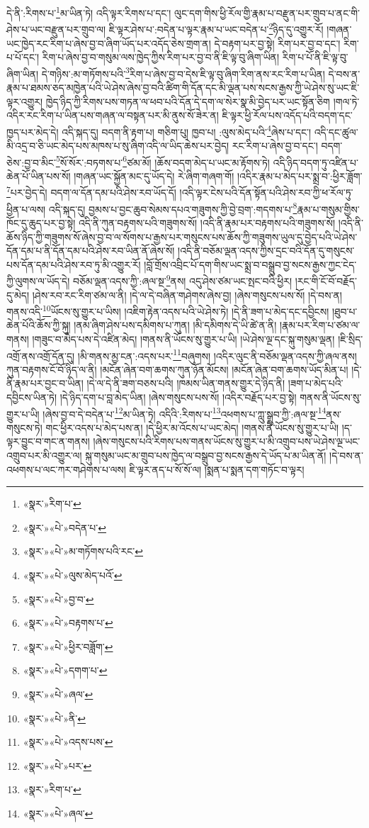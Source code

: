 དེ་ནི་:རིགས་པ་\footnote{«སྣར་»རིག་པ་}མ་ཡིན་ཏེ། འདི་ལྟར་རིགས་པ་དང་། ལུང་དག་གིས་ཕྱི་རོལ་གྱི་རྣམ་པ་བརྫུན་པར་གྲུབ་པ་ནང་གི་ཤེས་པ་ཡང་བརྫུན་པར་གྲུབ་ལ། ཇི་ལྟར་ཤེས་པ་:བདེན་པ་ལྟར་རྣམ་པ་ཡང་བདེན་པ་\footnote{«སྣར་»«པེ་»བདེན་པ་}ཉིད་དུ་འགྱུར་རོ། །གཞན་ཡང་ཁྱེད་རང་རིག་པ་ཞེས་བྱ་བ་ཞིག་ཡོད་པར་འདོད་ཅེས་གྲག་ན། དེ་བརྟག་པར་བྱ་སྟེ། རིག་པར་བྱ་བ་དང་། རིག་པ་པོ་དང་། རིག་པ་ཞེས་བྱ་བ་གསུམ་ལས་ཁྱེད་ཀྱིས་རིག་པར་བྱ་བ་ནི་ཇི་ལྟ་བུ་ཞིག་ཡིན། རིག་པ་པོ་ནི་ཇི་ལྟ་བུ་ཞིག་ཡིན། དེ་གཉིས་:མ་གཏོགས་པའི་\footnote{«སྣར་»«པེ་»མ་གཏོགས་པའི་རང་}རིག་པ་ཞེས་བྱ་བ་དེས་ཇི་ལྟ་བུ་ཞིག་རིག་ནས་རང་རིག་པ་ཡིན། དེ་བས་ན་རྣམ་པ་ཐམས་ཅད་མཁྱེན་པའི་ཡེ་ཤེས་ཞེས་བྱ་བའི་ཚིག་གི་དོན་དང་མི་ལྡན་པས་སངས་རྒྱས་ཀྱི་ཡེ་ཤེས་སུ་ཡང་ཇི་ལྟར་འགྱུར། ཁྱེད་ཉིད་ཀྱི་རིགས་པས་གཏན་ལ་ཕབ་པའི་དོན་དེ་དག་ལ་སེར་སྣ་མི་བྱེད་པར་ཡང་སྟོན་ཅིག །གལ་ཏེ་འདིར་རང་རིག་པ་ཡིན་པས་གཞན་ལ་བསྟན་པར་མི་ནུས་སོ་ཟེར་ན། ཇི་ལྟར་ཕྱི་རོལ་པས་འདོད་པའི་བདག་དང་ཁྱད་པར་མེད་དེ། འདི་སྐད་དུ། བདག་ནི་རྟག་པ། གཅིག་པུ། ཁྱབ་པ། :ལུས་མེད་པའི་\footnote{«སྣར་»«པེ་»ལུས་མེད་པའོ་}ཞེས་པ་དང་། འདི་དང་ཚུལ་མི་འདྲ་བ་ཅི་ཡང་མེད་པས་མཁས་པ་སུ་ཞིག་འདི་ལ་ཡིད་ཆེས་པར་བྱེད། རང་རིག་པ་ཞེས་བྱ་བ་དང་། བདག་ཅེས་:བྱ་བ་མིང་\footnote{«སྣར་»«པེ་»བྱ་བ་}སོ་སོར་:བཏགས་པ་\footnote{«སྣར་»«པེ་»བརྟགས་པ་}ཙམ་མོ། །ཆོས་བདག་མེད་པ་ཡང་མ་རྟོགས་ཏེ། འདི་ཉིད་བདག་ཏུ་འཛིན་པ་ཆེན་པོ་ཡིན་པས་སོ། །གཞན་ཡང་སྐྱོན་མང་དུ་ཡོད་དེ། རེ་ཞིག་གཞག་གོ། །འདིར་རྣམ་པ་མེད་པར་སྨྲ་བ་:ཕྱིར་ཟློག་\footnote{«སྣར་»«པེ་»ཕྱིར་བཟློག་}པར་བྱེད་དེ། བདག་ལ་དོན་དམ་པའི་ཤེས་རབ་ཡོད་དོ། །འདི་ལྟར་ངེས་པའི་དོན་སྟོན་པའི་ཤེས་རབ་ཀྱི་ཕ་རོལ་ཏུ་ཕྱིན་པ་ལས། འདི་སྐད་དུ། བྱམས་པ་བྱང་ཆུབ་སེམས་དཔའ་གཟུགས་ཀྱི་བྱེ་བྲག་:གདགས་པ་\footnote{«སྣར་»«པེ་»དགག་པ་}རྣམ་པ་གསུམ་གྱིས་ཁོང་དུ་ཆུད་པར་བྱ་སྟེ། འདི་ནི་ཀུན་བརྟགས་པའི་གཟུགས་སོ། །འདི་ནི་རྣམ་པར་བརྟགས་པའི་གཟུགས་སོ། །འདི་ནི་ཆོས་ཉིད་ཀྱི་གཟུགས་སོ་ཞེས་བྱ་བ་ལ་སོགས་པ་རྒྱས་པར་གསུངས་པས་ཆོས་ཀྱི་གཟུགས་ཡུལ་དུ་བྱེད་པའི་ཡེ་ཤེས་དོན་དམ་པ་ནི་དོན་དམ་པའི་ཤེས་རབ་ཡིན་ནོ་ཞེས་སོ། །འདི་ནི་བཅོམ་ལྡན་འདས་ཀྱིས་དྲང་བའི་དོན་དུ་གསུངས་པས་དོན་དམ་པའི་ཤེས་རབ་ཏུ་མི་འགྱུར་རོ། །བློ་གྲོས་འབྲིང་པོ་དག་གིས་ཡང་སྨྲ་བ་བསྒྲུབ་བྱ་སངས་རྒྱས་ཀྱང་ངེད་ཀྱི་ལུགས་ལ་ཡོད་དེ། བཅོམ་ལྡན་འདས་ཀྱི་:ཞལ་སྔ་\footnote{«སྣར་»«པེ་»ཞལ་}ནས། འདུ་ཤེས་ཙམ་ཡང་སྤང་བའི་ཕྱིར། །རང་གི་ངོ་བོ་བརྗོད་དུ་མེད། །ཤེས་རབ་རང་རིག་ཙམ་ལ་ནི། །དེ་ལ་དེ་བཞིན་གཤེགས་ཞེས་བྱ། །ཞེས་གསུངས་པས་སོ། །དེ་བས་ན། གནས་འདི་\footnote{«སྣར་»«པེ་»ནི་}ཡོངས་སུ་གྱུར་པ་ཡིས། །འཇིག་རྟེན་འདས་པའི་ཡེ་ཤེས་ཏེ། །དེ་ནི་ཟག་པ་མེད་དང་དབྱིངས། །ཐུབ་པ་ཆེན་པོའི་ཆོས་ཀྱི་སྐུ། །ནམ་ཞིག་ཤེས་པས་དམིགས་པ་ཀུན། །མི་དམིགས་དེ་ཡི་ཚེ་ན་ནི། །རྣམ་པར་རིག་པ་ཙམ་ལ་གནས། །གཟུང་བ་མེད་པས་དེ་འཛིན་མེད། །གནས་ནི་ཡོངས་སུ་གྱུར་པ་ཡི། །ཡེ་ཤེས་ལྔ་དང་སྐུ་གསུམ་ལྡན། །ཇི་སྲིད་འགྲོ་ནས་འགྲོ་དོན་དུ། །མི་གནས་མྱ་ངན་:འདས་པར་\footnote{«སྣར་»«པེ་»འདས་པས་}བཞུགས། །འདིར་ལུང་ནི་བཅོམ་ལྡན་འདས་ཀྱི་ཞལ་ནས། ཀུན་བརྟགས་ངོ་བོ་ཉིད་ལ་ནི། །མངོན་ཞེན་བག་ཆགས་ཀུན་ཉོན་མོངས། །མངོན་ཞེན་བག་ཆགས་ཡོད་མིན་པ། །དེ་ནི་རྣམ་པར་བྱང་བ་ཡིན། །དེ་ལ་དེ་ནི་ཟག་བཅས་པའི། །ཁམས་ཡིན་གནས་གྱུར་དེ་ཉིད་ནི། །ཟག་པ་མེད་པའི་དབྱིངས་ཡིན་ཏེ། །དེ་ཉིད་དག་པ་བླ་མེད་ཡིན། །ཞེས་གསུངས་པས་སོ། །འདིར་བརྗོད་པར་བྱ་སྟེ། གནས་ནི་ཡོངས་སུ་གྱུར་པ་ཡི། །ཞེས་བྱ་བ་དེ་བདེན་པ་\footnote{«སྣར་»«པེ་»པར་}མ་ཡིན་ཏེ། འདིའི་:རིགས་པ་\footnote{«སྣར་»རིག་པ་}འཕགས་པ་ཀླུ་སྒྲུབ་ཀྱི་:ཞལ་སྔ་\footnote{«སྣར་»«པེ་»ཞལ་}ནས་གསུངས་ཏེ། གང་ཕྱིར་འདས་པ་མེད་པས་ན། །དེ་ཕྱིར་མ་འོངས་པ་ཡང་མེད། །གནས་ནི་ཡོངས་སུ་གྱུར་པ་ཡི། །ད་ལྟར་བྱུང་བ་གང་ན་གནས། །ཞེས་གསུངས་པའི་རིགས་པས་གནས་ཡོངས་སུ་གྱུར་པ་མི་འགྲུབ་པས་ཡེ་ཤེས་ལྔ་ཡང་འགྲུབ་པར་མི་འགྱུར་ལ། སྐུ་གསུམ་ཡང་མ་གྲུབ་པས་ཁྱེད་ལ་བསྒྲུབ་བྱ་སངས་རྒྱས་དེ་ཡོད་པ་མ་ཡིན་ནོ། །དེ་བས་ན་འཕགས་པ་ལང་ཀར་གཤེགས་པ་ལས། ཇི་ལྟར་ནད་པ་སོ་སོ་ལ། །སྨན་པ་སྨན་དག་གཏོང་བ་ལྟར། 